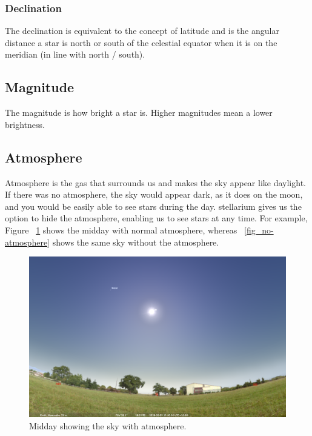 \subsubsection{Declination}
The declination is equivalent to the concept of latitude and is the angular distance a star is north or south of the celestial equator when it is on the meridian (in line with north / south).  

\subsection{Magnitude}
The magnitude is how bright a star is. Higher magnitudes mean a lower brightness.

\subsection{Atmosphere}
Atmosphere is the gas that surrounds us and makes the sky appear like daylight. If there was no atmosphere, the sky would appear dark, as it does on the moon, and you would be easily able to see stars during the day. stellarium gives us the option to hide the atmosphere, enabling us to see stars at any time. For example, Figure ~\ref{fig_with-atmosphere} shows the midday with normal atmosphere, whereas ~\ref{fig_no-atmosphere} shows the same sky without the atmosphere.

\begin{figure}[ht]
	\centerline{\includegraphics[width=1\columnwidth]{with-atmosphere.png}}
	\caption{\label{fig_with-atmosphere}{Midday showing the sky with atmosphere.}}
\end{figure}


